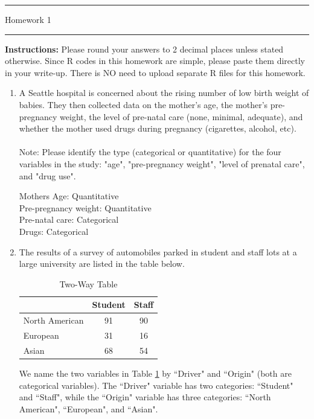 \documentclass[letterpaper,12pt]{article}
\begin{document}
\thispagestyle{empty}

\hrule \vspace{0.5em}
 \hfill Homework 1 \newline \hrule

\vspace{1em}
\textbf{Instructions:} Please round your answers to 2 decimal places unless stated otherwise. Since R codes in this homework are simple, please paste them directly in your write-up. There is NO need to upload separate R files for this homework.

\begin{enumerate}

\item A Seattle hospital is concerned about the rising number of low birth weight of babies. They then collected data on the mother's age, the mother's pre-pregnancy weight, the level of pre-natal care (none, minimal, adequate), and whether the mother used drugs during pregnancy (cigarettes, alcohol, etc).
\\\\Note: Please identify the type (categorical or quantitative) for the four variables in the study: "age", "pre-pregnancy weight", "level of prenatal care", and "drug use".

Mothers Age: Quantitative
\\
Pre-pregnancy weight: Quantitative
\\
Pre-natal care: Categorical
\\
Drugs: Categorical

\item The results of a survey of automobiles parked in student and staff lots at a large university are listed in the table below.
\begin{table}[h]
\centering
\renewcommand{\arraystretch}{1.2}
\begin{tabular}{|l|cc|} \hline
  & Student & Staff \\ \hline
North American & 91 & 90 \\
European & 31 & 16 \\
Asian & 68 & 54 \\ \hline  
\end{tabular}
\caption{Two-Way Table}
\label{tab1}
\end{table}

\vspace{-1em}
We name the two variables in Table \ref{tab1} by ``Driver" and ``Origin" (both are categorical variables). The ``Driver" variable has two categories: ``Student" and ``Staff", while the ``Origin" variable has three categories: ``North American", ``European", and ``Asian".


\end{enumerate}
\end{document}
